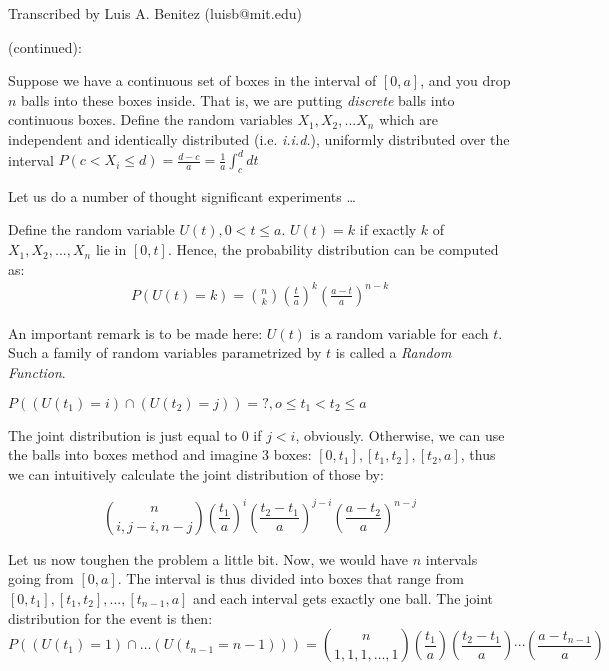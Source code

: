 \newline
{}\newline
\noindent Transcribed by Luis A. Benitez (luisb@mit.edu)\newline

 (continued):

Suppose we have a continuous set of boxes in the interval of $[0,a]$, and you
drop $n$ balls into these boxes inside.  That is, we are putting {\em discrete}
balls into continuous boxes.  Define the random variables $X_1, X_2, ... X_n$ which are independent and identically distributed (i.e.  {\em i.i.d.}),
uniformly distributed over the interval
$P(c < X_i \leq d) = \frac {d -c} {a} = \frac {1} {a} \int_{c}^{d} dt$

Let us do a number of thought significant experiments \ldots

Define the random variable $U(t), 0 < t \leq a$.  $U(t)=k$ if exactly 
$k$ of $X_1, X_2, ..., X_n$ lie in $[0,t]$.  Hence, the probability distribution can be computed as:
\begin{eqnarray*}
P(U(t) = k) = {n\choose k} \left( \frac {t} {a} \right)^k \left( \frac {a-t} {a} \right )^{n-k}
\end{eqnarray*}

An important remark is to be made here:
$U(t)$ is a random variable for each $t$.  Such a family of random variables
parametrized by $t$ is called a {\em Random Function}.

$P((U(t_1)=i) \cap (U(t_2)=j)) = ?,  o \leq t_1 < t_2 \leq a$

The joint distribution is just equal to 0 if $ j < i$, obviously.  
Otherwise, we can use the balls into boxes method and imagine 3 boxes: $[0,t_1] , [t_1,t_2], [t_2,a]$, thus we can intuitively
calculate the joint distribution of those by:

\begin{displaymath}
{{n}\choose{i, j-i, n-j}}\left( \frac {t_1} {a} \right)^i \left( \frac {t_2 - t_1} {a} \right)^{j-i} \left( \frac {a - t_2} {a} \right)^{n-j}
\end{displaymath}

Let us now toughen the problem a little bit.  Now, we would have $n$ intervals going from $[0,a]$.  The interval is thus divided into boxes that range from $[0,t_1], [t_1, t_2], ... ,[t_{n-1}, a]$ and each interval gets exactly one ball.  The joint distribution for the event is then:
\begin{displaymath}
P((U(t_1)=1) \cap \ldots (U(t_{n-1} = n-1)))
={{n}\choose{1,1,1, \ldots ,1}}\left( \frac {t_1} {a} \right) \left( \frac {t_2 - t_1} {a} \right) \cdots \left( \frac {a - t_{n-1}} {a} \right)
\end{displaymath}

